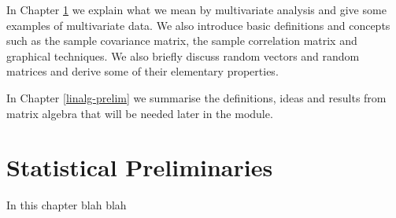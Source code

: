 \documentclass[]{book}
\theoremstyle{definition}
\theoremstyle{definition}
\theoremstyle{definition}
\theoremstyle{remark}
\begin{document}
In Chapter \ref{stat-prelim} we explain what we mean by multivariate analysis and give some examples of multivariate data. We also introduce basic definitions and concepts such as the sample covariance matrix, the sample correlation matrix and graphical techniques. We also briefly discuss random vectors and random matrices and derive some of their elementary properties.

In Chapter \ref{linalg-prelim} we summarise the definitions, ideas and results from matrix algebra that will be needed later in the module.

\renewcommand{\bY}{\boldsymbol Y}
\renewcommand{\bx}{\boldsymbol x}
\renewcommand{\bX}{\boldsymbol X}
\renewcommand{\bH}{\boldsymbol H}
\renewcommand{\by}{\boldsymbol y}
\renewcommand{\bz}{\boldsymbol z}
\renewcommand{\bS}{\boldsymbol S}
\renewcommand{\bR}{\boldsymbol R}
\renewcommand{\bI}{\boldsymbol I}
\renewcommand{\bmu}{\boldsymbol \mu}
\renewcommand{\bSigma}{\boldsymbol \Sigma}
\renewcommand{\bLambda}{\boldsymbol \Lambda}
\renewcommand{\bgamma}{\boldsymbol \gamma}
\renewcommand{\blambda}{\boldsymbol \lambda}
\renewcommand{\bA}{\boldsymbol A}
\renewcommand{\bB}{\boldsymbol B}
\renewcommand{\bD}{\boldsymbol D}
\renewcommand{\bM}{\boldsymbol M}
\renewcommand{\bP}{\boldsymbol P}
\renewcommand{\bQ}{\boldsymbol Q}
\renewcommand{\bT}{\boldsymbol T}
\renewcommand{\bW}{\boldsymbol W}
\renewcommand{\ba}{\boldsymbol a}
\renewcommand{\bb}{\boldsymbol b}
\renewcommand{\bc}{\boldsymbol c}
\renewcommand{\bd}{\boldsymbol d}
\renewcommand{\bh}{\boldsymbol h}
\renewcommand{\bp}{\boldsymbol p}
\renewcommand{\bq}{\boldsymbol q}
\renewcommand{\bu}{\boldsymbol u}
\renewcommand{\bzero}{\boldsymbol 0}
\renewcommand{\mR}{\mathbb R}
\renewcommand{\cR}{\mathcal R}

\renewcommand{\bs}{\boldsymbol}
\renewcommand{\ds}{\displaystyle}
\renewcommand{\tdiag}{\text{diag}}
\renewcommand{\ttr}{\text{tr}}
\renewcommand{\tmin}{\text{min}}
\renewcommand{\tmax}{\text{max}}
\renewcommand{\tdet}{\text{det}}

\renewcommand{\tcov}{\text{cov}}
\renewcommand{\texp}{\text{exp}}
\renewcommand{\lb}{\left(}
\renewcommand{\rb}{\right)}
\renewcommand{\lsb}{\left[}
\renewcommand{\rsb}{\right]}

\hypertarget{stat-prelim}{%
\chapter{Statistical Preliminaries}\label{stat-prelim}}

In this chapter blah blah
\end{document}
